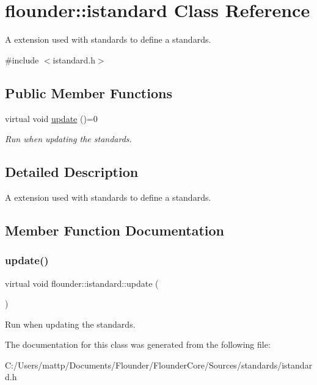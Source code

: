 \hypertarget{classflounder_1_1istandard}{}\section{flounder\+:\+:istandard Class Reference}
\label{classflounder_1_1istandard}


A extension used with standards to define a standards.  




{\ttfamily \#include $<$istandard.\+h$>$}

\subsection*{Public Member Functions}
\begin{DoxyCompactItemize}
\item 
virtual void \hyperlink{classflounder_1_1istandard_a3297f71b53e925c6ab6536c2697f93fc}{update} ()=0
\begin{DoxyCompactList}\small\item\em Run when updating the standards. \end{DoxyCompactList}\end{DoxyCompactItemize}


\subsection{Detailed Description}
A extension used with standards to define a standards. 



\subsection{Member Function Documentation}
\mbox{\label{classflounder_1_1istandard_a3297f71b53e925c6ab6536c2697f93fc}} 
\subsubsection{\texorpdfstring{update()}{update()}}
{\footnotesize\ttfamily virtual void flounder\+::istandard\+::update (\begin{DoxyParamCaption}{ }\end{DoxyParamCaption})\hspace{0.3cm}{\ttfamily [pure virtual]}}



Run when updating the standards. 



The documentation for this class was generated from the following file\+:\begin{DoxyCompactItemize}
\item 
C\+:/\+Users/mattp/\+Documents/\+Flounder/\+Flounder\+Core/\+Sources/standards/istandard.\+h\end{DoxyCompactItemize}
